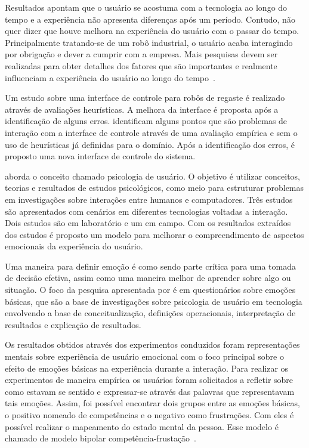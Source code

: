 Resultados apontam que o usuário se acostuma com a tecnologia ao longo do tempo e a experiência não apresenta diferenças após um período. Contudo, não quer dizer que houve melhora na experiência do usuário com o passar do tempo. Principalmente tratando-se de um robô industrial, o usuário acaba interagindo por obrigação e dever a cumprir com a empresa. Mais pesquisas devem ser realizadas para obter detalhes dos fatores que são importantes e realmente influenciam a experiência do usuário ao longo do tempo~\cite{buchner:2013}.

Um estudo sobre uma interface de controle para robôs de regaste é realizado através de avaliações heurísticas. A melhora da interface é proposta após a identificação de alguns erros. \textcite{naveed:2014} identificam alguns pontos que são problemas de interação com a interface de controle através de uma avaliação empírica e sem o uso de heurísticas já definidas para o domínio. Após a identificação dos erros, é proposto uma nova interface de controle do sistema.

\textcite{saariluoma:2014} aborda o conceito chamado psicologia de usuário. O objetivo é utilizar conceitos, teorias e resultados de estudos psicológicos, como meio para estruturar problemas em investigações sobre interações entre humanos e computadores. Três estudos são apresentados com cenários em diferentes tecnologias voltadas a interação. Dois estudos são em laboratório e um em campo. Com os resultados extraídos dos estudos é proposto um modelo para melhorar o compreendimento de aspectos emocionais da experiência do usuário.

Uma maneira para definir emoção é como sendo parte crítica para uma tomada de decisão efetiva, assim como uma maneira melhor de aprender sobre algo ou situação. O foco da pesquisa apresentada por \textcite{saariluoma:2014} é em questionários sobre emoções básicas, que são a base de investigações sobre psicologia de usuário em tecnologia envolvendo a base de conceitualização, definições operacionais, interpretação de resultados e explicação de resultados.

Os resultados obtidos através dos experimentos conduzidos foram representações mentais sobre experiência de usuário emocional com o foco principal sobre o efeito de emoções básicas na experiência durante a interação. Para realizar os experimentos de maneira empírica os usuários foram solicitados a refletir sobre como estavam se sentido e expressar-se através das palavras que representavam tais emoções. Assim, foi possível encontrar dois grupos entre as emoções básicas, o positivo nomeado de competências e o negativo como frustrações. Com eles é possível realizar o mapeamento do estado mental da pessoa. Esse modelo é chamado de modelo bipolar competência-frustação~\cite{saariluoma:2014}.

